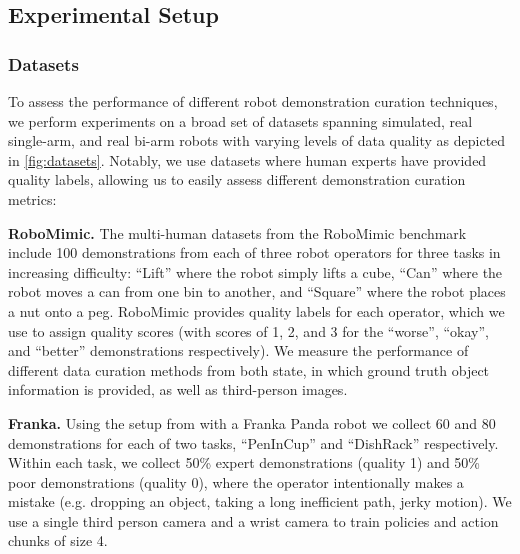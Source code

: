 \subsection{Experimental Setup}

\subsubsection{Datasets}
To assess the performance of different robot demonstration curation techniques, we perform experiments on a broad set of datasets spanning simulated, real single-arm, and real bi-arm robots with varying levels of data quality as depicted in \cref{fig:datasets}. Notably, we use datasets where human experts have provided quality labels, allowing us to easily assess different demonstration curation metrics:

\noindent \textbf{RoboMimic.} The multi-human datasets from the RoboMimic benchmark \citep{robomimic} include 100 demonstrations from each of three robot operators for three tasks in increasing difficulty: ``Lift'' where the robot simply lifts a cube, ``Can'' where the robot moves a can from one bin to another, and ``Square'' where the robot places a nut onto a peg. RoboMimic provides quality labels for each operator, which we use to assign quality scores (with scores of 1, 2, and 3 for the ``worse'', ``okay'', and ``better'' demonstrations respectively). We measure the performance of different data curation methods from both state, in which ground truth object information is provided, as well as third-person images. 

\noindent \textbf{Franka.} Using the setup from \citet{droid} with a Franka Panda robot we collect 60 and 80 demonstrations for each of two tasks, ``PenInCup'' and ``DishRack'' respectively. Within each task, we collect 50\% expert demonstrations (quality 1) and 50\%  poor demonstrations (quality 0), where the operator intentionally makes a mistake (e.g. dropping an object, taking a long inefficient path, jerky motion). We use a single third person camera and a wrist camera to train policies and action chunks of size 4. 

